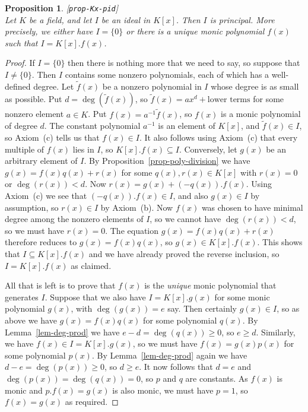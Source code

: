 \documentclass{amsart}
\newcommand{\lbl}[1]{\label{#1}\textup{[\texttt{#1}]}\ \\}
\newcommand{\lbl}{\label}
\newcommand{\sse}       {\subseteq}
\newcommand{\tf}	{\tilde{f}}
\renewcommand{\:}{\colon}
\newtheorem{proposition}[theorem]{Proposition}
\theoremstyle{definition}
\begin{document}
\begin{proposition}\lbl{prop-Kx-pid}
 Let $K$ be a field, and let $I$ be an ideal in $K[x]$.  Then $I$ is
 principal.  More precisely, we either have $I=\{0\}$ or there is a
 unique monic polynomial $f(x)$ such that $I=K[x].f(x)$.
\end{proposition}


\begin{proof}
 If $I=\{0\}$ then there is nothing more that we need to say, so
 suppose that $I\neq\{0\}$.  Then $I$ contains some nonzero
 polynomials, each of which has a well-defined degree.  Let $\tf(x)$
 be a nonzero polynomial in $I$ whose degree is as small as possible.
 Put $d=\deg(\tf(x))$, so $\tf(x)=ax^d+\text{lower terms}$ for some
 nonzero element $a\in K$.  Put $f(x)=a^{-1}\tf(x)$, so $f(x)$ is a
 monic polynomial of degree $d$.  The constant polynomial $a^{-1}$ is
 an element of $K[x]$, and $\tf(x)\in I$, so Axiom~(c) tells us that
 $f(x)\in I$.  It also follows using Axiom~(c) that every multiple of
 $f(x)$ lies in $I$, so $K[x].f(x)\sse I$.  Conversely, let $g(x)$ be
 an arbitrary element of $I$.  By Proposition~\ref{prop-poly-division}
 we have $g(x)=f(x)q(x)+r(x)$ for some $q(x),r(x)\in K[x]$ with
 $r(x)=0$ or $\deg(r(x))<d$.  Now $r(x)=g(x)+(-q(x)).f(x)$.  Using
 Axiom~(c) we see that $(-q(x)).f(x)\in I$, and also $g(x)\in I$ by
 assumption, so $r(x)\in I$ by Axiom~(b).  Now $f(x)$ was chosen to
 have minimal degree among the nonzero elements of $I$, so we cannot
 have $\deg(r(x))<d$, so we must have $r(x)=0$.  The equation
 $g(x)=f(x)q(x)+r(x)$ therefore reduces to $g(x)=f(x)q(x)$, so
 $g(x)\in K[x].f(x)$.  This shows that $I\sse K[x].f(x)$ and we have
 already proved the reverse inclusion, so $I=K[x].f(x)$ as claimed.

 All that is left is to prove that $f(x)$ is the \emph{unique} monic
 polynomial that generates $I$.  Suppose that we also have
 $I=K[x].g(x)$ for some monic polynomial $g(x)$, with $\deg(g(x))=e$
 say.  Then certainly $g(x)\in I$, so as above we have $g(x)=f(x)q(x)$
 for some polynomial $q(x)$.  By Lemma~\ref{lem-deg-prod} we have
 $e-d=\deg(q(x))\geq 0$, so $e\geq d$.  Similarly, we have
 $f(x)\in I=K[x].g(x)$, so we must have $f(x)=g(x)p(x)$ for some
 polynomial $p(x)$.  By Lemma~\ref{lem-deg-prod} again we have
 $d-e=\deg(p(x))\geq 0$, so $d\geq e$.  It now follows that $d=e$ and
 $\deg(p(x))=\deg(q(x))=0$, so $p$ and $q$ are constants.  As $f(x)$
 is monic and $p.f(x)=g(x)$ is also monic, we must have $p=1$, so
 $f(x)=g(x)$ as required.
\end{proof}
\end{document}
